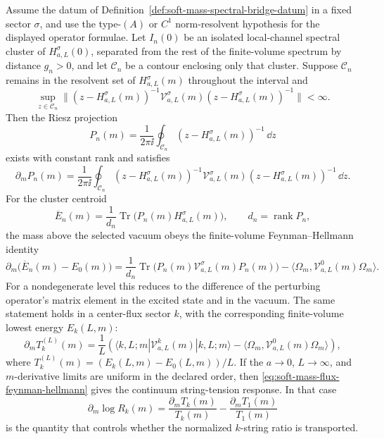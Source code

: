 \begin{controlledapproximation}
\label{ca:soft-mass-finite-volume-spectral-transport}
Assume the datum of
Definition~\ref{def:soft-mass-spectral-bridge-datum} in a fixed sector
\(\sigma\), and use the type-\((A)\) or \(C^1\) norm-resolvent hypothesis
for the displayed operator formulae.  Let \(I_n(0)\) be an isolated
local-channel spectral cluster of \(H_{a,L}^{\sigma}(0)\), separated from the
rest of the finite-volume spectrum by distance \(g_n>0\), and let
\(\mathcal C_n\) be a contour enclosing only that cluster.  Suppose
\(\mathcal C_n\) remains in the resolvent set of \(H_{a,L}^{\sigma}(m)\)
throughout the interval and
\[
  \sup_{z\in\mathcal C_n}
  \|(z-H_{a,L}^{\sigma}(m))^{-1}
    \mathcal V_{a,L}^{\sigma}(m)
    (z-H_{a,L}^{\sigma}(m))^{-1}\|
  <\infty .
\]
Then the Riesz projection
\begin{equation}
  P_n(m)=\frac{1}{2\pi\ii}
  \oint_{\mathcal C_n}(z-H_{a,L}^{\sigma}(m))^{-1}\,\dd z
  \label{eq:soft-mass-riesz-projection}
\end{equation}
exists with constant rank and satisfies
\begin{equation}
  \partial_mP_n(m)
  =
  \frac{1}{2\pi\ii}
  \oint_{\mathcal C_n}
  (z-H_{a,L}^{\sigma}(m))^{-1}\mathcal V_{a,L}^{\sigma}(m)
  (z-H_{a,L}^{\sigma}(m))^{-1}\,\dd z .
  \label{eq:soft-mass-projection-derivative}
\end{equation}
For the cluster centroid
\[
  \overline E_n(m)
  =
  \frac{1}{d_n}
  \operatorname{Tr}\bigl(P_n(m)H_{a,L}^{\sigma}(m)\bigr),
  \qquad d_n=\operatorname{rank}P_n,
\]
the mass above the selected vacuum obeys the finite-volume
Feynman--Hellmann identity
\begin{equation}
  \partial_m\bigl(\overline E_n(m)-E_0(m)\bigr)
  =
  \frac{1}{d_n}
  \operatorname{Tr}\bigl(P_n(m)\mathcal V_{a,L}^{\sigma}(m)P_n(m)\bigr)
  -
  \langle\Omega_m,\mathcal V_{a,L}^{0}(m)\Omega_m\rangle .
  \label{eq:soft-mass-cluster-feynman-hellmann}
\end{equation}
For a nondegenerate level this reduces to the difference of the perturbing
operator's matrix element in the excited state and in the vacuum.  The same
statement holds in a center-flux sector \(k\), with the corresponding
finite-volume lowest energy \(E_k(L,m)\):
\begin{equation}
  \partial_m T_k^{(L)}(m)
  =
  \frac1L\left(
    \langle k,L;m|\mathcal V_{a,L}^{k}(m)|k,L;m\rangle
    -
    \langle\Omega_m,\mathcal V_{a,L}^{0}(m)\Omega_m\rangle
  \right),
  \label{eq:soft-mass-flux-feynman-hellmann}
\end{equation}
where \(T_k^{(L)}(m)=(E_k(L,m)-E_0(L,m))/L\).  If the
\(a\to0\), \(L\to\infty\), and \(m\)-derivative limits are uniform in the
declared order, then \eqref{eq:soft-mass-flux-feynman-hellmann} gives the
continuum string-tension response.  In that case
\begin{equation}
  \partial_m\log R_k(m)
  =
  \frac{\partial_mT_k(m)}{T_k(m)}
  -
  \frac{\partial_mT_1(m)}{T_1(m)}
  \label{eq:soft-mass-ratio-response}
\end{equation}
is the quantity that controls whether the normalized \(k\)-string ratio is
transported.
\end{controlledapproximation}

